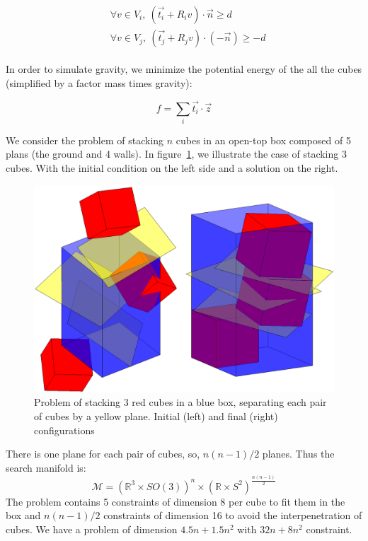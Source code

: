 \begin{align}
  \begin{split}
    &\forall v\in V_i,\ (\vec{t_i} + R_i v)\cdot \vec{n} \geq d \\
    &\forall v\in V_j,\ (\vec{t_j} + R_j v)\cdot \left(-\vec{n}\right) \geq -d
  \end{split}
\end{align}

In order to simulate gravity, we minimize the potential energy of the all the cubes (simplified by a factor mass times gravity):

\begin{equation}
  f = \sum\limits_i \vec{t_i}\cdot \vec{z}
\end{equation}

We consider the problem of stacking $n$ cubes in an open-top box composed of 5 plans (the ground and 4 walls).
In figure~\ref{fig:cubes}, we illustrate the case of stacking 3 cubes.
With the initial condition on the left side and a solution on the right.
\begin{figure}
\centering
  \includegraphics[width=.8\linewidth]{3cubes.png}
  \caption{Problem of stacking 3 red cubes in a blue box, separating each pair of cubes by a yellow plane. Initial (left) and final (right) configurations}
\label{fig:cubes}
\end{figure}

There is one plane for each pair of cubes, so, $n(n-1)/2$ planes.
Thus the search manifold is:
\begin{equation}
  \mathcal{M} = {\left( \mathbb{R}^3\times SO(3) \right)}^n \times {\left( \mathbb{R} \times S^2 \right)}^{\frac{n(n-1)}{2}} \nonumber
\end{equation}
The problem contains 5 constraints of dimension 8 per cube to fit them in the box and $n(n-1)/2$ constraints of dimension 16 to avoid the interpenetration of cubes.
We have a problem of dimension $4.5n+1.5n^2$ with $32n+8n^2$ constraint.

